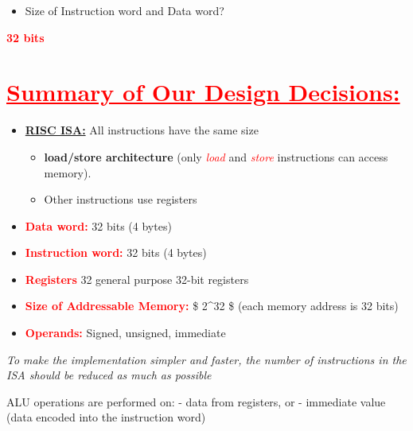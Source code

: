 \documentclass[
  14pt,
  a4paper,
  DIV=11,
  numbers=noendperiod,
  headinclude=true,
  footinclude=true]{scrreprt}
\providecommand{\tightlist}{%
  \setlength{\itemsep}{0pt}\setlength{\parskip}{0pt}}\usepackage{longtable,booktabs,array}
\begin{document}
\begin{tcolorbox}[colback=boxbodycol, colframe=boxbodycol]

\begin{itemize}
\tightlist
\item
  Size of Instruction word and Data word?
\end{itemize}

\end{tcolorbox}

\textcolor{red}{\textbf{32 bits}}

\section{\texorpdfstring{\textcolor{red}{\underline{Summary of Our Design Decisions:}}}{}}\label{section-4}

\begin{tcolorbox}[colback=boxbodycol, colframe=boxbodycol]

\begin{itemize}
\tightlist
\item
  \underline{\textbf{RISC ISA:}} All instructions have the same size

  \begin{itemize}
  \tightlist
  \item
    \textbf{load/store architecture} (only \textcolor{red}{\emph{load}}
    and \textcolor{red}{\emph{store}} instructions can access memory).
  \item
    Other instructions use registers
  \end{itemize}
\item
  \textcolor{red}{\textbf{Data word:}} 32 bits (4 bytes)
\item
  \textcolor{red}{\textbf{Instruction word:}} 32 bits (4 bytes)
\item
  \textcolor{red}{\textbf{Registers}} 32 general purpose 32-bit
  registers
\item
  \textcolor{red}{\textbf{Size of Addressable Memory:}} \$ 2\^{}32 \$
  (each memory address is 32 bits)
\item
  \textcolor{red}{\textbf{Operands:}} Signed, unsigned, immediate
\end{itemize}

\emph{To make the implementation simpler and faster, the number of
instructions in the ISA should be reduced as much as possible}

ALU operations are performed on: - data from registers, or - immediate
value (data encoded into the instruction word)

\end{tcolorbox}
\end{document}
